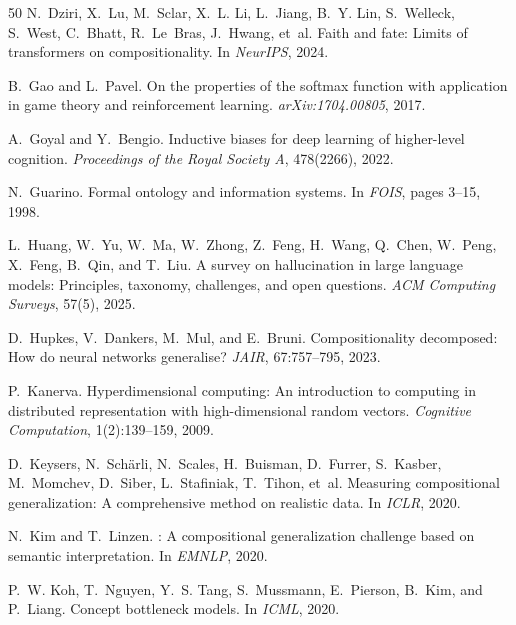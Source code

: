 \documentclass{article}
\begin{document}
\begin{thebibliography}{50}
N.~Dziri, X.~Lu, M.~Sclar, X.~L. Li, L.~Jiang, B.~Y. Lin, S.~Welleck,
  S.~West, C.~Bhatt, R.~Le~Bras, J.~Hwang, et~al.
\newblock Faith and fate: Limits of transformers on compositionality.
\newblock In \emph{NeurIPS}, 2024.

B.~Gao and L.~Pavel.
\newblock On the properties of the softmax function with application in game
  theory and reinforcement learning.
\newblock \emph{arXiv:1704.00805}, 2017.

A.~Goyal and Y.~Bengio.
\newblock Inductive biases for deep learning of higher-level cognition.
\newblock \emph{Proceedings of the Royal Society A}, 478(2266), 2022.

N.~Guarino.
\newblock Formal ontology and information systems.
\newblock In \emph{FOIS}, pages 3--15, 1998.

L.~Huang, W.~Yu, W.~Ma, W.~Zhong, Z.~Feng, H.~Wang, Q.~Chen, W.~Peng,
  X.~Feng, B.~Qin, and T.~Liu.
\newblock A survey on hallucination in large language models: Principles,
  taxonomy, challenges, and open questions.
\newblock \emph{ACM Computing Surveys}, 57(5), 2025.

D.~Hupkes, V.~Dankers, M.~Mul, and E.~Bruni.
\newblock Compositionality decomposed: How do neural networks generalise?
\newblock \emph{JAIR}, 67:757--795, 2023.

P.~Kanerva.
\newblock Hyperdimensional computing: An introduction to computing in
  distributed representation with high-dimensional random vectors.
\newblock \emph{Cognitive Computation}, 1(2):139--159, 2009.

D.~Keysers, N.~Sch\"{a}rli, N.~Scales, H.~Buisman, D.~Furrer, S.~Kasber,
  M.~Momchev, D.~Siber, L.~Stafiniak, T.~Tihon, et~al.
\newblock Measuring compositional generalization: A comprehensive method on
  realistic data.
\newblock In \emph{ICLR}, 2020.

N.~Kim and T.~Linzen.
: A compositional generalization challenge based on semantic
  interpretation.
\newblock In \emph{EMNLP}, 2020.

P.~W. Koh, T.~Nguyen, Y.~S. Tang, S.~Mussmann, E.~Pierson, B.~Kim, and
  P.~Liang.
\newblock Concept bottleneck models.
\newblock In \emph{ICML}, 2020.


\end{thebibliography}
\end{document}
